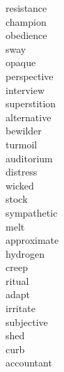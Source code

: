 \documentclass[a4paper, 10pt]{ctexart}
\begin{document}
\begin{multicols*}{2}
\begin{description}
\item[resistance]

\item[champion]

\item[obedience]

\item[sway]

\item[opaque]

\item[perspective]

\item[interview]

\item[superstition]

\item[alternative]

\item[bewilder]

\item[turmoil]

\item[auditorium]

\item[distress]

\item[wicked]

\item[stock]

\item[sympathetic]

\item[melt]

\item[approximate]

\item[hydrogen]

\item[creep]

\item[ritual]

\item[adapt]

\item[irritate]

\item[subjective]

\item[shed]

\item[curb]

\item[accountant]


\end{description}
\end{multicols*}
\end{document}
